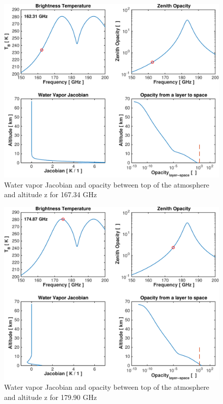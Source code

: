 \documentclass[paper=a4, fontsize=11pt]{scrartcl} %
\numberwithin{figure}{section}
\begin{document}
\begin{figure}[h]
\centering
	\includegraphics[width=\textwidth]{plots/jac_162GHz.pdf}
	\caption{Water vapor Jacobian and opacity between top of the atmosphere and altitude z for 167.34 GHz}
\end{figure}

\begin{figure}[h]
\centering
	\includegraphics[width=\textwidth]{plots/jac_175GHz.pdf}
	\caption{Water vapor Jacobian and opacity between top of the atmosphere and altitude z for 179.90 GHz}
\end{figure}
\end{document}
